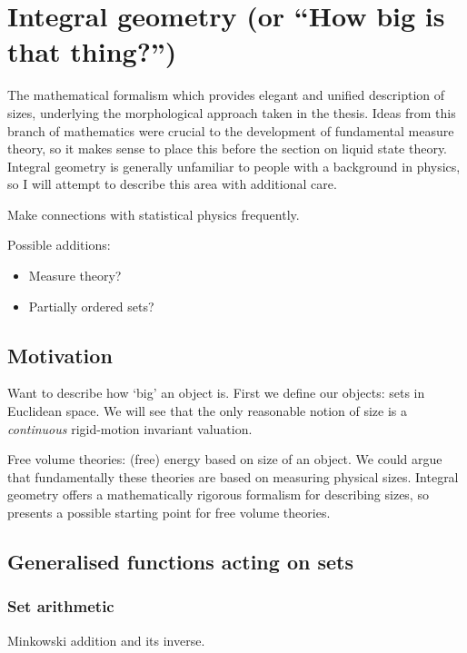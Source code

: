 \section{Integral geometry (or ``How big is that thing?'')}

The mathematical formalism which provides elegant and unified description of sizes, underlying the morphological approach taken in the thesis.
Ideas from this branch of mathematics were crucial to the development of fundamental measure theory, so it makes sense to place this before the section
on liquid state theory.
Integral geometry is generally unfamiliar to people with a background in physics, so I will attempt to describe this area with additional care.

Make connections with statistical physics frequently.

Possible additions:
\begin{itemize}
\item Measure theory?
\item Partially ordered sets?
\end{itemize}

\subsection{Motivation}

Want to describe how `big' an object is.
First we define our objects: sets in Euclidean space.
We will see that the only reasonable notion of size is a \emph{continuous} rigid-motion invariant valuation.

Free volume theories: (free) energy based on size of an object.
We could argue that fundamentally these theories are based on measuring physical sizes.
Integral geometry offers a mathematically rigorous formalism for describing sizes, so presents a possible starting point for free volume theories.

\subsection{Generalised functions acting on sets}
\subsubsection{Set arithmetic}
Minkowski addition and its inverse.

